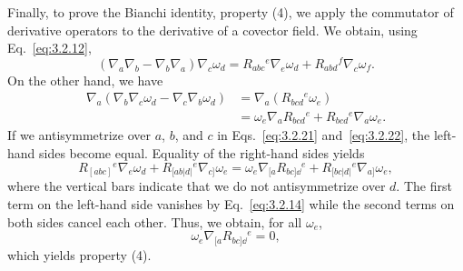 Finally, to prove the Bianchi identity, property (4), we apply the commutator of
derivative operators to the derivative of a covector field. We obtain, using Eq.~\eqref{eq:3.2.12},
\begin{equation}
  (\nabla_a\nabla_b-\nabla_b\nabla_a)\nabla_c\omega_d
  =R_{abc}{}^e\nabla_e\omega_d+R_{abd}{}^f\nabla_c\omega_f.
  \tag{3.2.21}\label{eq:3.2.21}
\end{equation}
On the other hand, we have
\begin{equation}
  \begin{aligned}
    \nabla_a(\nabla_b\nabla_c\omega_d-\nabla_c\nabla_b\omega_d)
    &=\nabla_a(R_{bcd}{}^e\omega_e)\\
    &=\omega_e\nabla_aR_{bcd}{}^e+R_{bcd}{}^e\nabla_a\omega_e.
  \end{aligned}
  \tag{3.2.22}\label{eq:3.2.22}
\end{equation}
If we antisymmetrize over $a$, $b$, and $c$ in Eqs.~\eqref{eq:3.2.21} and~\eqref{eq:3.2.22}, the
left-hand sides become equal. Equality of the right-hand sides yields
\begin{equation}
  R_{[abc]}{}^e\nabla_e\omega_d
  +R_{[ab|d|}{}^e\nabla_{c]}\omega_e
  =\omega_e\nabla_{[a}R_{bc]\dd}{}^e
  +R_{[bc|d|}{}^e\nabla_{a]}\omega_e,
  \tag{3.2.23}\label{eq:3.2.23}
\end{equation}
where the vertical bars indicate that we do not antisymmetrize over $d$. The first term
on the left-hand side vanishes by Eq.~\eqref{eq:3.2.14} while the second terms on both
sides cancel each other. Thus, we obtain, for all $\omega_e$,
\begin{equation}
  \omega_e\nabla_{[a}R_{bc]\dd}{}^e=0,
  \tag{3.2.24}\label{eq:3.2.24}
\end{equation}
which yields property (4).

